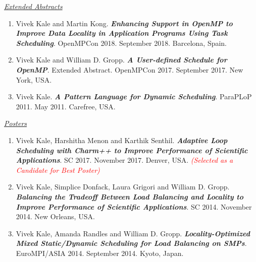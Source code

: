 \underline{\textit{Extended Abstracts}}
\begin{enumerate}
\item Vivek Kale and Martin Kong. \textbf{\textit{Enhancing Support in OpenMP to Improve Data Locality in Application Programs Using Task Scheduling}}. OpenMPCon 2018. September 2018. Barcelona, Spain.
\item Vivek Kale and William D. Gropp. \textbf{\textit{A User-defined Schedule for OpenMP}}. Extended Abstract. OpenMPCon
  2017. September 2017. New York, USA.
\item Vivek Kale. \textbf{\textit{A Pattern Language for Dynamic Scheduling}}. ParaPLoP 2011. May 2011. Carefree, USA.
\end{enumerate}

\underline{\textit{Posters}}
\begin{enumerate}
\item Vivek Kale, Harshitha Menon and Karthik Senthil. \textbf{\textit{Adaptive Loop Scheduling with Charm++ to Improve Performance of Scientific Applications}}. SC 2017. November 2017. Denver, USA. \textit{\textcolor{red}{(Selected as a Candidate for Best Poster)}}
\item Vivek Kale, Simplice Donfack, Laura Grigori and William D. Gropp. \textbf{\textit{Balancing the Tradeoff Between Load Balancing and Locality to Improve Performance of Scientific Applications}}. SC 2014. November 2014. New Orleans, USA.
\item Vivek Kale, Amanda Randles and William D. Gropp. \textbf{\textit{Locality-Optimized Mixed Static/Dynamic
      Scheduling for Load Balancing on SMPs}}. EuroMPI/ASIA 2014. September 2014. Kyoto, Japan.
\end{enumerate}










